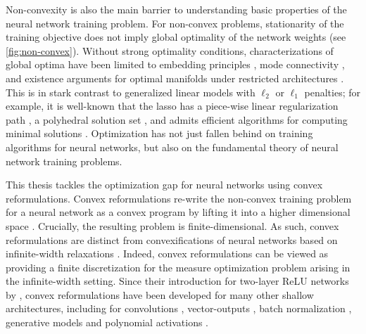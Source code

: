 Non-convexity is also the main barrier to understanding basic properties of the
neural network training problem.
For non-convex problems, stationarity of the training objective does not imply
global optimality of the network weights (see \cref{fig:non-convex}).
Without strong optimality conditions, characterizations of global optima have
been limited to embedding principles
\citep{fukumizu2000plateau, zhang2021embedding}, mode connectivity
\citep{garipov2018mode, draxler2018barriers}, and existence
arguments for optimal manifolds under restricted architectures
\citep{cooper2021global}.
This is in stark contrast to generalized linear models with \( \ell_2 \)
or \( \ell_1 \) penalties;
for example, it is well-known that the lasso \citep{tibshirani1996regression}
has a piece-wise linear regularization path \citep{osborne2000new, efron2004least},
a polyhedral solution set \citep{tibshirani2013unique}, and
admits efficient algorithms for computing
minimal solutions \citep{tibshirani2013unique}.
Optimization has not just fallen behind on training algorithms for neural
networks, but also on the fundamental theory of neural network training
problems.

This thesis tackles the optimization gap for neural networks using convex
reformulations.
Convex reformulations re-write the non-convex training problem for a neural
network as a convex program by lifting it into a higher dimensional space
\citep{pilanci2020convexnn}.
Crucially, the resulting problem is finite-dimensional.
As such, convex reformulations are distinct from convexifications of neural
networks based on infinite-width relaxations
\citep{bach2017breaking, bengio2006convex}.
Indeed, convex reformulations can be viewed as providing a finite
discretization for the measure optimization problem arising in the
infinite-width setting.
Since their introduction for two-layer ReLU networks by
\citet{pilanci2020convexnn}, convex reformulations have been developed for many
other shallow architectures, including for convolutions
\citep{sahiner2020convex,ergen2021implicit,gupta2021exact}, vector-outputs
\citep{sahiner2021vector}, batch normalization \citep{ergen2021demystifying},
generative models \citep{sahiner2021hidden} and polynomial activations
\citep{bartan2025polynomial}.

